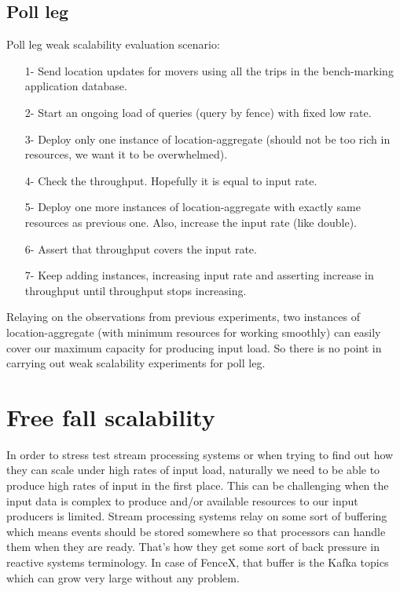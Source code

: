\documentclass[a4]{report}
\begin{document}
    \subsection{Poll leg}
    Poll leg weak scalability evaluation scenario:
    \begin{itemize}
        \item[1-] Send location updates for movers using all the trips in the bench-marking application database.
        \item[2-] Start an ongoing load of queries (query by fence) with fixed low rate.
        \item[3-] Deploy only one instance of location-aggregate (should not be too rich in resources, we want it to
        be overwhelmed).
        \item[4-] Check the throughput. Hopefully it is equal to input rate.
        \item[5-] Deploy one more instances of location-aggregate with exactly same resources as previous one. Also,
        increase the input rate (like double).
        \item[6-] Assert that throughput covers the input rate.
        \item[7-] Keep adding instances, increasing input rate and asserting increase in throughput until throughput
        stops increasing.
    \end{itemize}

    Relaying on the observations from previous experiments, two instances of location-aggregate (with minimum
    resources for working smoothly) can easily cover our maximum capacity for producing input load.
    So there is no point in carrying out weak scalability experiments for poll leg.


    \section{Free fall scalability}
    In order to stress test stream processing systems or when trying to find out how they can scale under high rates
    of input load, naturally we need to be able to produce high rates of input in the first place.
    This can be challenging when the input data is complex to produce and/or available resources to our input
    producers is limited.
    Stream processing systems relay on some sort of buffering which means events should be stored somewhere so
    that processors can handle them when they are ready.
    That's how they get some sort of back pressure in reactive systems terminology.
    In case of FenceX, that buffer is the Kafka topics which can grow very large without any problem.
\end{document}
